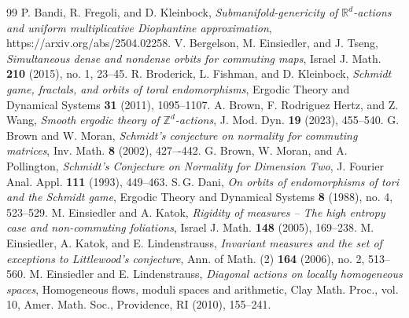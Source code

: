 \documentclass[reqno,12pt]{amsart}
\theoremstyle{definition}
\numberwithin{equation}{section}
\newcommand{\RR}{\mathbb{R}}
\newcommand{\ZZ}{\mathbb{Z}}
\newcommand{\SL}{\mathrm{SL}}
\begin{document}
{\begin{thebibliography}{99}
 P. Bandi, R. Fregoli, and D. Kleinbock, \textit{Submanifold-genericity of $\mathbb{R}^d$-actions and uniform multiplicative Diophantine approximation}, https://arxiv.org/abs/2504.02258.
 V. Bergelson, M. Einsiedler, and J. Tseng, \textsl{Simultaneous dense and nondense orbits for commuting maps}, Israel J. Math. {\bf 210} (2015), no. 1,  23--45.
 R. Broderick, L. Fishman, and D. Kleinbock, \textit{Schmidt game, fractals, and orbits of toral endomorphisms}, Ergodic Theory and Dynamical Systems {\bf 31} (2011), 1095--1107.
 A. Brown, F. Rodriguez Hertz, and Z. Wang, \textit{Smooth ergodic theory of $\mathbb{Z}^d$-actions}, %
J. Mod. Dyn. {\bf 19} (2023), 455--540.
 G. Brown  and W. Moran, \textit{Schmidt's conjecture on normality for commuting matrices}, Inv. Math.  {\bf 8} (2002),  427–-442.
 G. Brown, W. Moran, and A. Pollington, \textit{Schmidt’s Conjecture on Normality for Dimension Two}, J. Fourier Anal. Appl.   {\bf 111} (1993),  449–463.
  S.\,G. Dani, \textit{On orbits of endomorphisms of tori and the Schmidt game}, Ergodic Theory and Dynamical Systems {\bf 8} (1988), no. 4, 523--529.
 M. Einsiedler and A. Katok, \textsl{Rigidity of measures -- The high entropy case and non-commuting foliations}, Israel J. Math. {\bf 148} (2005), 169--238.
 M. Einsiedler, A. Katok, and E. Lindenstrauss, \textsl{Invariant measures and the set of exceptions to Littlewood's conjecture}, Ann. of Math. (2) {\bf 164} (2006), no. 2, 513--560.
 M. Einsiedler and E. Lindenstrauss, \textit{Diagonal actions on locally homogeneous spaces}, Homogeneous flows, moduli spaces and arithmetic, Clay Math. Proc., vol. 10, Amer. Math. Soc.,
Providence, RI (2010), 155--241.


\end{thebibliography}}
\end{document}

